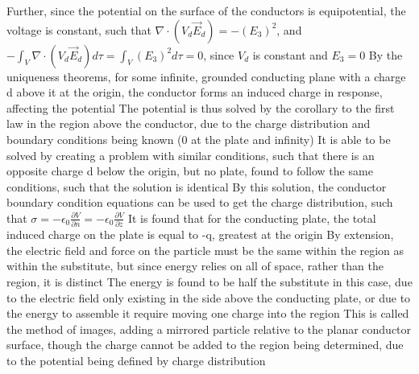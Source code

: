 \documentclass[11 pt, twoside]{article}
\newenvironment{outline*}
{
	\begin{outline}[enumerate]
	}
	{\end{outline}
}
\begin{document}
\begin{outline*}
			\4 Further, since the potential on the surface of the conductors is equipotential, the voltage is constant, such that $\nabla \cdot (V_d\vec{E}_d) = -(E_3)^2$, and $-\int_V \nabla \cdot (V_d\vec{E}_d)d\tau = \int_V (E_3)^2d\tau = 0$, since $V_d$ is constant and $E_3 = 0$
\1 By the uniqueness theorems, for some infinite, grounded conducting plane with a charge d above it at the origin, the conductor forms an induced charge in response, affecting the potential
	\2 The potential is thus solved by the corollary to the first law in the region above the conductor, due to the charge distribution and boundary conditions being known (0 at the plate and infinity)
		\3 It is able to be solved by creating a problem with similar conditions, such that there is an opposite charge d below the origin, but no plate, found to follow the same conditions, such that the solution is identical
	\2 By this solution, the conductor boundary condition equations can be used to get the charge distribution, such that $\sigma = -\epsilon_0\frac{\partial V}{\partial n} = -\epsilon_0\frac{\partial V}{\partial z}$
		\3 It is found that for the conducting plate, the total induced charge on the plate is equal to -q, greatest at the origin
	\2 By extension, the electric field and force on the particle must be the same within the region as within the substitute, but since energy relies on all of space, rather than the region, it is distinct
		\3 The energy is found to be half the substitute in this case, due to the electric field only existing in the side above the conducting plate, or due to the energy to assemble it require moving one charge into the region
	\2 This is called the method of images, adding a mirrored particle relative to the planar conductor surface, though the charge cannot be added to the region being determined, due to the potential being defined by charge distribution
\end{outline*}
\end{document}
